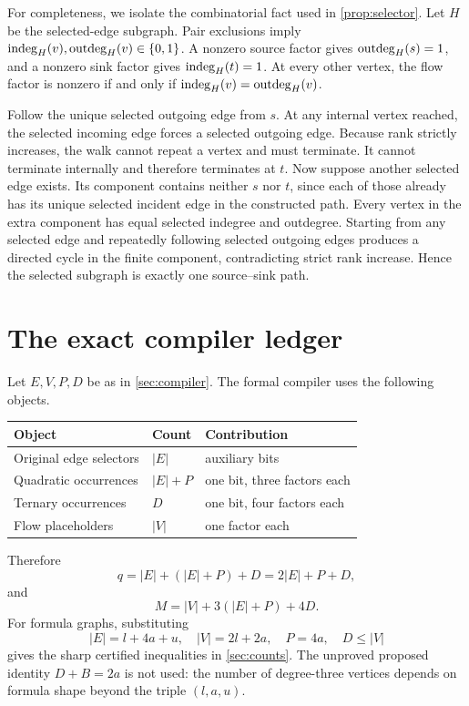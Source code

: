 For completeness, we isolate the combinatorial fact used in \cref{prop:selector}.  Let
\(H\) be the selected-edge subgraph.  Pair exclusions imply
\(\operatorname{indeg}_H(v),\operatorname{outdeg}_H(v)\in\{0,1\}\).  A nonzero source factor gives
\(\operatorname{outdeg}_H(s)=1\), and a nonzero sink factor gives \(\operatorname{indeg}_H(t)=1\).  At every other
vertex, the flow factor is nonzero if and only if
\(\operatorname{indeg}_H(v)=\operatorname{outdeg}_H(v)\).

Follow the unique selected outgoing edge from \(s\).  At any internal vertex reached, the
selected incoming edge forces a selected outgoing edge.  Because rank strictly increases,
the walk cannot repeat a vertex and must terminate.  It cannot terminate internally and
therefore terminates at \(t\).  Now suppose another selected edge exists.  Its component
contains neither \(s\) nor \(t\), since each of those already has its unique selected
incident edge in the constructed path.  Every vertex in the extra component has equal
selected indegree and outdegree.  Starting from any selected edge and repeatedly following
selected outgoing edges produces a directed cycle in the finite component, contradicting
strict rank increase.  Hence the selected subgraph is exactly one source--sink path.

\section{The exact compiler ledger}\label{app:ledger}

Let \(E,V,P,D\) be as in \cref{sec:compiler}.  The formal compiler uses the following
objects.

\begin{center}
\begin{tabular}{@{}lll@{}}
\toprule
Object & Count & Contribution\\
\midrule
Original edge selectors & \(|E|\) & auxiliary bits\\
Quadratic occurrences & \(|E|+P\) & one bit, three factors each\\
Ternary occurrences & \(D\) & one bit, four factors each\\
Flow placeholders & \(|V|\) & one factor each\\
\bottomrule
\end{tabular}
\end{center}

Therefore
\[
 q=|E|+(|E|+P)+D=2|E|+P+D,
\]
and
\[
 M=|V|+3(|E|+P)+4D.
\]
For formula graphs, substituting
\[
 |E|=l+4a+u,\quad |V|=2l+2a,\quad P=4a,\quad D\le|V|
\]
gives the sharp certified inequalities in \cref{sec:counts}.  The unproved proposed
identity \(D+B=2a\) is not used: the number of degree-three vertices depends on formula
shape beyond the triple \((l,a,u)\).

